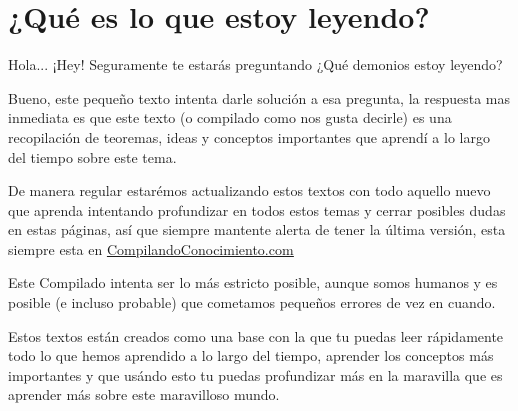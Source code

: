 \documentclass[12pt, fleqn]{report}                             %
\theoremstyle{break}                                            %
\begin{document}
\restoregeometry                                                    %
\nopagecolor                                                        %




\tableofcontents{}
\label{sec:Index}

\clearpage





\section{¿Qué es lo que estoy leyendo?}
    
    Hola... ¡Hey! Seguramente te estarás preguntando
    ¿Qué demonios estoy leyendo?

    Bueno, este pequeño texto intenta darle solución a esa pregunta, la respuesta mas inmediata es
    que este texto (o compilado como nos gusta decirle) es una recopilación de teoremas, ideas
    y conceptos importantes que aprendí a lo largo del tiempo sobre este tema.

    De manera regular estarémos actualizando estos textos con todo aquello nuevo que aprenda intentando
    profundizar en todos estos temas y cerrar posibles dudas en estas páginas, así que siempre mantente
    alerta de tener la última versión, esta siempre esta en \href{http://www.CompilandoConocimiento.com}
    {\underline{CompilandoConocimiento.com}} 

    Este Compilado intenta ser lo más estricto posible, aunque somos humanos y es posible (e incluso probable) que
    cometamos pequeños errores de vez en cuando.

    Estos textos están creados como una base con la que tu puedas leer rápidamente todo lo que hemos aprendido
    a lo largo del tiempo, aprender los conceptos más importantes y que usándo esto tu puedas profundizar
    más en la maravilla que es aprender más sobre este maravilloso mundo.
\end{document}
